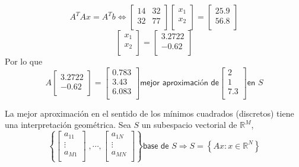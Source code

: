 \begin{ejemplo}
$$A^TAx = A^Tb \Leftrightarrow \begin{bmatrix}
14 & 32 \\
32 & 77 \\
\end{bmatrix}
\begin{bmatrix}
x_1 \\
x_2 \\
\end{bmatrix}
=
\begin{bmatrix}
25.9 \\
56.8 \\
\end{bmatrix}$$
$$
\begin{bmatrix}
x_1 \\
x_2 \\
\end{bmatrix}
=
\begin{bmatrix}
3.2722 \\
-0.62 \\
\end{bmatrix}
$$
Por lo que
$$ A \begin{bmatrix}
3.2722 \\
-0.62 \\
\end{bmatrix}
= 
\begin{bmatrix}
0.783 \\
3.43 \\
6.083 \\
\end{bmatrix} \textsf{mejor aproximación de} \begin{bmatrix}
2 \\
1 \\
7.3 \\
\end{bmatrix} \textsf{en } S$$

\end{ejemplo}

La mejor aproximación en el sentido de los mínimos cuadrados (discretos) tiene una interpretación geométrica. Sea $S$ un subespacio vectorial de $\mathbb{R}^M$, 
\[ \left\lbrace \begin{bmatrix}
a_{11} \\
\vdots \\
a_{M1} \\
\end{bmatrix}
\; ,\cdots ,
\begin{bmatrix}
a_{1N} \\
\vdots \\
a_{MN} \\
\end{bmatrix}
\right\rbrace 
\textsf{base de } S \Rightarrow S = \left\lbrace Ax : x \in \mathbb{R}^N \right\rbrace \]

